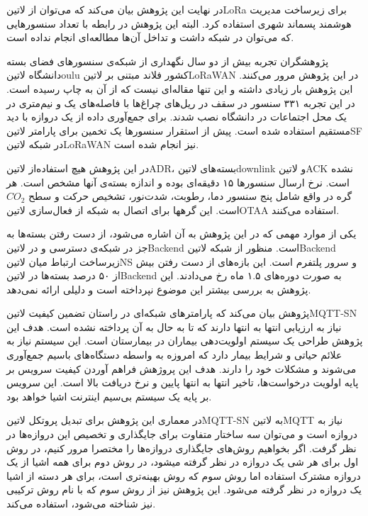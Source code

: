 در نهایت این پژوهش بیان می‌کند که می‌توان از ‌لاتین{LoRa} برای زیرساخت مدیریت هوشمند پسماند شهری استفاده کرد.
البته این پژوهش در رابطه با تعداد سنسورهایی که می‌توان در شبکه داشت و تداخل آن‌ها مطالعه‌ای انجام نداده است.


پژوهشگران  تجربه بیش از دو سال نگهداری از شبکه‌ی سنسورهای فضای بسته دانشگاه ‌لاتین{oulu} کشور فلاند مبتنی بر ‌لاتین{LoRaWAN} در این پژوهش مرور می‌کنند.
این پژوهش بار زیادی داشته و این تنها مقاله‌ای نیست که از آن به چاپ رسیده است. در این تجربه ۳۳۱ سنسور در سقف در ریل‌های چراغ‌ها با فاصله‌های یک و نیم‌متری در یک محل اجتماعات در دانشگاه نصب شدند.
برای جمع‌آوری داده از یک دروازه با دید مستقیم استفاده شده است. پیش از استقرار سنسورها یک تخمین برای پارامتر ‌لاتین{SF} در شبکه ‌لاتین{LoRaWAN} نیز انجام شده است.

در این پژوهش هیچ استفاده‌از ‌لاتین{ADR}، بسته‌های ‌لاتین{downlink} و ‌لاتین{ACK} نشده است. نرخ ارسال سنسورها ۱۵ دقیقه‌ای بوده و اندازه بسته‌ی آنها مشخص است.
هر گره در واقع شامل پنج سنسور دما، رطوبت، شدت‌نور، تشخیص حرکت و سطح $CO_{2}$ است. این گرهها برای اتصال به شبکه از فعال‌سازی ‌لاتین{OTAA} استفاده می‌کنند.

یکی از موارد مهمی که در این پژوهش به آن اشاره می‌شود، از دست رفتن بسته‌ها به جز در شبکه‌ی دسترسی و در ‌لاتین{Backend} است.
منظور از شبکه ‌لاتین{Backend} زیرساخت ارتباط میان ‌لاتین{NS} و سرور پلتفرم است.
این بازه‌های از دست رفتن بیش از ۵۰ درصد بسته‌ها در ‌لاتین{Backend} به صورت دوره‌های ۱.۵ ماه رخ می‌دادند. این پژوهش به بررسی بیشتر این موضوع نپرداخته است و دلیلی ارائه نمی‌دهد.


پژوهش  بیان می‌کند که پارامترهای شبکه‌ای در راستان تضمین کیفیت ‌لاتین{MQTT-SN} نیاز به ارزیابی
انتها به انتها دارند که تا به حال به آن پرداخته نشده است.
هدف این پژوهش طراحی یک سیستم اولویت‌دهی بیماران در بیمارستان است. این سیستم نیاز به علائم حیاتی و شرایط بیمار دارد که
امروزه به واسطه دستگاه‌های باسیم جمع‌آوری می‌شوند و مشکلات خود را دارند.
هدف این پروژهش فراهم آوردن کیفیت سرویس بر پایه اولویت درخواست‌ها، تاخیر انتها به انتها پایین و نرخ دریافت بالا است.
این سرویس بر پایه یک سیستم بی‌سیم اینترنت اشیا خواهد بود.

در معماری این پژوهش برای تبدیل پروتکل ‌لاتین{MQTT-SN} به ‌لاتین{MQTT} نیاز به دروازه است و
می‌توان سه ساختار متفاوت برای جایگذاری و تخصیص این دروازه‌ها در نظر گرفت.
اگر بخواهیم روش‌های جایگذاری دروازه‌ها را مختصرا مرور کنیم،
در روش اول برای هر شی یک دروازه در نظر گرفته میشود، در روش دوم برای همه اشیا از یک دروازه
مشترک استفاده اما روش سوم که روش بهینه‌تری است، برای هر دسته از اشیا یک دروازه در نظر گرفته می‌شود.
این پژوهش نیز از روش سوم که با نام روش ترکیبی نیز شناخته می‌شود، استفاده می‌کند.

